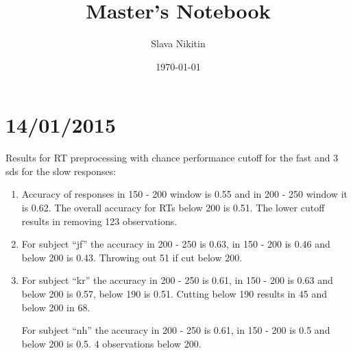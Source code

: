 \documentclass[12pt, a4paper]{article}\usepackage[]{graphicx}\usepackage[]{color}
\author{Slava Nikitin}
\title{Master's Notebook}
\date{\today}
\begin{document}
\maketitle

\section{14/01/2015}
Results for RT preprocessing with chance performance cutoff for the fast and 3 sds for the slow responses:
\begin{enumerate}
\item Accuracy of responses in 150 - 200 window is  0.55 and in 200 - 250 window it is 0.62. The overall accuracy for RTs below 200 is 0.51. The lower cutoff results in removing 123 observations.

\item For subject ``jf'' the accuracy in 200 - 250 is 0.63, in 150 - 200 is 0.46 and below 200 is 0.43. Throwing out 51 if cut below 200.

\item For subject ``kr'' the accuracy in 200 - 250 is 0.61, in 150 - 200 is 0.63 and below 200 is 0.57, below 190 is 0.51. Cutting below 190 results in 45 and below 200 in 68.	

For subject ``nh'' the accuracy in 200 - 250 is 0.61, in 150 - 200 is 0.5 and below 200 is 0.5. 4 observations below 200.
\end{enumerate}
\end{document}
